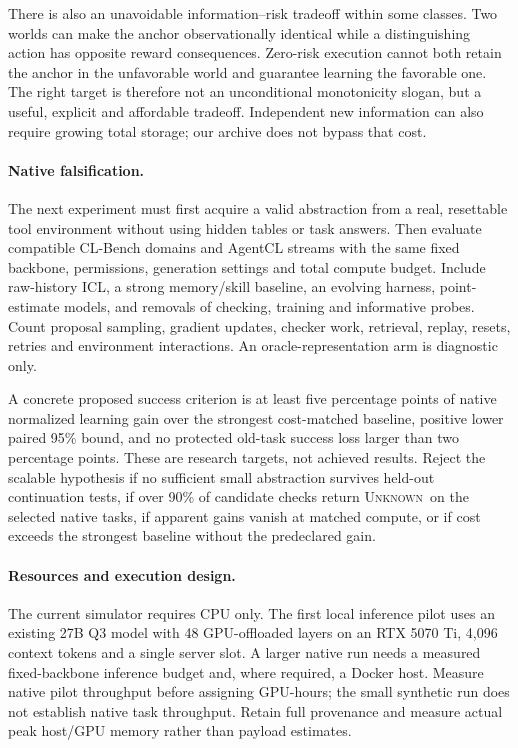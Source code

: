 \documentclass[10pt,twocolumn]{article}
\newcommand{\unk}{\textsc{Unknown}}
\begin{document}
There is also an unavoidable information--risk tradeoff within some classes.
Two worlds can make the anchor observationally identical while a distinguishing
action has opposite reward consequences. Zero-risk execution cannot both retain
the anchor in the unfavorable world and guarantee learning the favorable one.
The right target is therefore not an unconditional monotonicity slogan, but a
useful, explicit and affordable tradeoff. Independent new information can also
require growing total storage; our archive does not bypass that cost.

\paragraph{Native falsification.}
The next experiment must first acquire a valid abstraction from a real, resettable
tool environment without using hidden tables or task answers. Then evaluate
compatible CL-Bench domains and AgentCL streams with the same fixed backbone,
permissions, generation settings and total compute budget. Include raw-history
ICL, a strong memory/skill baseline, an evolving harness, point-estimate models,
and removals of checking, training and informative probes. Count proposal
sampling, gradient updates, checker work, retrieval, replay, resets, retries and
environment interactions. An oracle-representation arm is diagnostic only.

A concrete proposed success criterion is at least five percentage points of
native normalized learning gain over the strongest cost-matched baseline,
positive lower paired 95\% bound, and no protected old-task success loss larger
than two percentage points. These are research targets, not achieved results.
Reject the scalable hypothesis if no sufficient small abstraction survives
held-out continuation tests, if over 90\% of candidate checks return \unk\ on
the selected native tasks, if apparent gains vanish at matched compute, or if
cost exceeds the strongest baseline without the predeclared gain.

\paragraph{Resources and execution design.}
The current simulator requires CPU only. The first local inference pilot uses an existing 27B Q3 model with 48 GPU-offloaded
layers on an RTX 5070 Ti, 4,096 context tokens and a single server slot. A larger
native run needs a measured fixed-backbone inference budget and, where required,
a Docker host. Measure native pilot throughput before assigning GPU-hours;
the small synthetic run does not establish native task throughput. Retain full provenance and
measure actual peak host/GPU memory rather than payload estimates.
\end{document}
